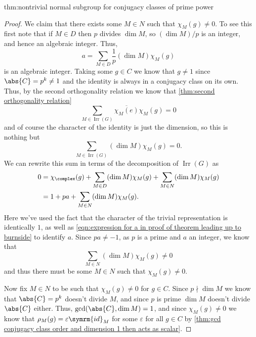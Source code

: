 \documentclass[fleqn]{NotesClass}
\newcommand{\id}{\symrm{id}}
\DeclareMathOperator{\Irr}{Irr}
\begin{document}
\begin{thm}{}{thm:nontrivial normal subgroup for conjugacy classes of prime power}
\begin{proof}
            We claim that there exists some \(M \in N\) such that \(\chi_M(g) \ne 0\).
            To see this first note that if \(M \in D\) then \(p\) divides \(\dim M\), so \((\dim M)/p\) is an integer, and hence an algebraic integer.
            Thus,
            \begin{equation}
                \label{eqn:expression for a in proof of theorem leading up to burnside}
                a = \sum_{M \in D} \frac{1}{p} (\dim M) \chi_M(g)
            \end{equation}
            is an algebraic integer.
            Taking some \(g \in C\) we know that \(g \ne 1\) since \(\abs{C} = p^k \ne 1\) and the identity is always in a conjugacy class on its own.
            Thus, by the second orthogonality relation we know that \cref{thm:second orthogonality relation}
            \begin{equation}
                \sum_{M \in \Irr (G)} \overline{\chi_M(e)} \chi_M(g) = 0
            \end{equation}
            and of course the character of the identity is just the dimension, so this is nothing but
            \begin{equation}
                \sum_{M \in \Irr(G)} (\dim M) \chi_M(g) = 0.
            \end{equation}
            We can rewrite this sum in terms of the decomposition of \(\Irr(G)\) as
            \begin{align}
                0 &= \chi_{\complex}(g) + \sum_{M \in D} (\dim M) \chi_M(g) + \sum_{M \in N} (\dim M) \chi_M(g)\\
                &= 1 + p a + \sum_{M \in N} (\dim M) \chi_M(g).
            \end{align}
            Here we've used the fact that the character of the trivial representation is identically \(1\), as well as \cref{eqn:expression for a in proof of theorem leading up to burnside} to identify \(a\).
            Since \(pa \ne -1\), as \(p\) is a prime and \(a\) an integer, we know that
            \begin{equation}
                \sum_{M \in N} (\dim M)\chi_M(g) \ne 0
            \end{equation}
            and thus there must be some \(M \in N\) such that \(\chi_M(g) \ne 0\).
            
            Now fix \(M \in N\) to be such that \(\chi_M(g) \ne 0\) for \(g \in C\).
            Since \(p \nmid \dim M\) we know that \(\abs{C} = p^k\) doesn't divide \(M\), and since \(p\) is prime \(\dim M\) doesn't divide \(\abs{C}\) either.
            Thus, \(\gcd(\abs{C}, \dim M) = 1\), and since \(\chi_M(g) \ne 0\) we know that \(\rho_M(g) = \varepsilon \id_M\) for some \(\varepsilon\) for all \(g \in C\) by \cref{thm:gcd conjugacy class order and dimension 1 then acts as scalar}.
            

\end{proof}
\end{thm}
\end{document}
